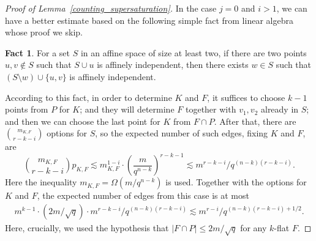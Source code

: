 \documentclass[11pt]{article}
\theoremstyle{definition}
\newtheorem{fact}[theorem]{Fact}
\begin{document}
\begin{proof}[Proof of Lemma~\ref{counting_supersaturation}]
    In the case $j = 0$ and $i > 1$, we can have a better estimate based on the following simple fact from linear algebra whose proof we skip.
    \begin{fact}
        For a set $S$ in an affine space of size at least two, if there are two points $u,v \not \in S$ such that $S \cup u$ is affinely independent, then there exists $w \in S$ such that $(S \setminus w) \cup \{u,v\}$ is affinely independent.
    \end{fact}

    
    According to this fact, in order to determine $K$ and $F$, it suffices to choose $k-1$ points from $P$ for $K$; and they will determine $F$ together with $v_1, v_2$ already in $S$; and then we can choose the last point for $K$ from $F \cap P$. After that, there are $\binom{m_{K,F}}{r-k-i}$ options for $S$, so the expected number of such edges, fixing $K$ and $F$, are \begin{equation*}
        \binom{m_{K,F}}{r-k-i} p_{K,F} \lesssim m_{K,F}^{1-i} \cdot \left(\frac{m}{q^{n-k}} \right)^{r-k - 1} \lesssim m^{r-k-i}/q^{(n-k)(r-k-i)}.
    \end{equation*} Here the inequality $m_{K,F} = \Omega(m/q^{n-k})$ is used. Together with the options for $K$ and $F$, the expected number of edges from this case is at most \begin{align*}
        m^{k-1} \cdot \left( 2m/\sqrt{q} \right) \cdot m^{r-k-i}/q^{(n-k)(r-k-i)} \lesssim m^{r-i}/q^{(n-k)(r-k-i)+1/2}.
    \end{align*} Here, crucially, we used the hypothesis that $|F \cap P| \leq 2m/\sqrt{q}$ for any $k$-flat $F$.


\end{proof}
\end{document}
